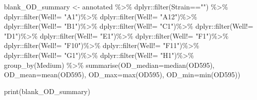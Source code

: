 \documentclass[
]{article}
\newenvironment{Shaded}{\begin{snugshade}}{\end{snugshade}}
\newcommand{\AttributeTok}[1]{\textcolor[rgb]{0.77,0.63,0.00}{#1}}
\newcommand{\FunctionTok}[1]{\textcolor[rgb]{0.00,0.00,0.00}{#1}}
\newcommand{\NormalTok}[1]{#1}
\newcommand{\OtherTok}[1]{\textcolor[rgb]{0.56,0.35,0.01}{#1}}
\newcommand{\SpecialCharTok}[1]{\textcolor[rgb]{0.00,0.00,0.00}{#1}}
\newcommand{\StringTok}[1]{\textcolor[rgb]{0.31,0.60,0.02}{#1}}
\begin{document}
\begin{Shaded}
\begin{Highlighting}[]
\NormalTok{blank\_OD\_summary }\OtherTok{\textless{}{-}}\NormalTok{ annotated }\SpecialCharTok{\%\textgreater{}\%}
\NormalTok{   dplyr}\SpecialCharTok{::}\FunctionTok{filter}\NormalTok{(Strain}\SpecialCharTok{==}\StringTok{""}\NormalTok{) }\SpecialCharTok{\%\textgreater{}\%}
\NormalTok{   dplyr}\SpecialCharTok{::}\FunctionTok{filter}\NormalTok{(Well}\SpecialCharTok{!=} \StringTok{"A1"}\NormalTok{)}\SpecialCharTok{\%\textgreater{}\%}
\NormalTok{   dplyr}\SpecialCharTok{::}\FunctionTok{filter}\NormalTok{(Well}\SpecialCharTok{!=} \StringTok{"A12"}\NormalTok{)}\SpecialCharTok{\%\textgreater{}\%}
\NormalTok{   dplyr}\SpecialCharTok{::}\FunctionTok{filter}\NormalTok{(Well}\SpecialCharTok{!=} \StringTok{"B1"}\NormalTok{)}\SpecialCharTok{\%\textgreater{}\%}
\NormalTok{   dplyr}\SpecialCharTok{::}\FunctionTok{filter}\NormalTok{(Well}\SpecialCharTok{!=} \StringTok{"C1"}\NormalTok{)}\SpecialCharTok{\%\textgreater{}\%}
\NormalTok{   dplyr}\SpecialCharTok{::}\FunctionTok{filter}\NormalTok{(Well}\SpecialCharTok{!=} \StringTok{"D1"}\NormalTok{)}\SpecialCharTok{\%\textgreater{}\%}
\NormalTok{   dplyr}\SpecialCharTok{::}\FunctionTok{filter}\NormalTok{(Well}\SpecialCharTok{!=} \StringTok{"E1"}\NormalTok{)}\SpecialCharTok{\%\textgreater{}\%}
\NormalTok{   dplyr}\SpecialCharTok{::}\FunctionTok{filter}\NormalTok{(Well}\SpecialCharTok{!=} \StringTok{"F1"}\NormalTok{)}\SpecialCharTok{\%\textgreater{}\%}
\NormalTok{   dplyr}\SpecialCharTok{::}\FunctionTok{filter}\NormalTok{(Well}\SpecialCharTok{!=} \StringTok{"F10"}\NormalTok{)}\SpecialCharTok{\%\textgreater{}\%}
\NormalTok{   dplyr}\SpecialCharTok{::}\FunctionTok{filter}\NormalTok{(Well}\SpecialCharTok{!=} \StringTok{"F11"}\NormalTok{)}\SpecialCharTok{\%\textgreater{}\%}
\NormalTok{   dplyr}\SpecialCharTok{::}\FunctionTok{filter}\NormalTok{(Well}\SpecialCharTok{!=} \StringTok{"G1"}\NormalTok{)}\SpecialCharTok{\%\textgreater{}\%}
\NormalTok{   dplyr}\SpecialCharTok{::}\FunctionTok{filter}\NormalTok{(Well}\SpecialCharTok{!=} \StringTok{"H1"}\NormalTok{)}\SpecialCharTok{\%\textgreater{}\%}
  \FunctionTok{group\_by}\NormalTok{(Medium) }\SpecialCharTok{\%\textgreater{}\%}
  \FunctionTok{summarise}\NormalTok{(}\AttributeTok{OD\_median=}\FunctionTok{median}\NormalTok{(OD595),}
            \AttributeTok{OD\_mean=}\FunctionTok{mean}\NormalTok{(OD595),}
            \AttributeTok{OD\_max=}\FunctionTok{max}\NormalTok{(OD595),}
            \AttributeTok{OD\_min=}\FunctionTok{min}\NormalTok{(OD595))}

\FunctionTok{print}\NormalTok{(blank\_OD\_summary)}
\end{Highlighting}
\end{Shaded}
\end{document}
